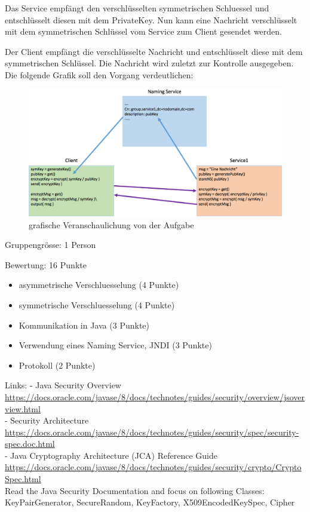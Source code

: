 Das Service empfängt den verschlüsselten symmetrischen Schluessel und entschlüsselt diesen mit dem PrivateKey. Nun kann eine Nachricht verschlüsselt mit dem symmetrischen Schlüssel vom Service zum Client gesendet werden.

Der Client empfängt die verschlüsselte Nachricht und entschlüsselt diese mit dem symmetrischen Schlüssel. Die Nachricht wird zuletzt zur Kontrolle ausgegeben.
\clearpage
Die folgende Grafik soll den Vorgang verdeutlichen:

\begin{figure}[!h]
	\begin{center}
		\includegraphics[width=\textwidth]{images/dezsys05_java_security_demo1.png}
		\caption{grafische Veranschaulichung von der Aufgabe}
		\label{broker}
	\end{center}
\end{figure}

Gruppengrösse: 1 Person

Bewertung: 16 Punkte
\begin{itemize}
	\item asymmetrische Verschluesselung (4 Punkte)
	\item symmetrische Verschluesselung (4 Punkte)
	\item Kommunikation in Java (3 Punkte)
	\item Verwendung eines Naming Service, JNDI (3 Punkte)
	\item Protokoll (2 Punkte)
\end{itemize}

Links:
- Java Security Overview\\ \url{https://docs.oracle.com/javase/8/docs/technotes/guides/security/overview/jsoverview.html}\\
- Security Architecture\\ \url{https://docs.oracle.com/javase/8/docs/technotes/guides/security/spec/security-spec.doc.html}\\
- Java Cryptography Architecture (JCA) Reference Guide\\ \url{https://docs.oracle.com/javase/8/docs/technotes/guides/security/crypto/CryptoSpec.html}\\

Read the Java Security Documentation and focus on following Classes: KeyPairGenerator, SecureRandom, KeyFactory, X509EncodedKeySpec, Cipher

\clearpage